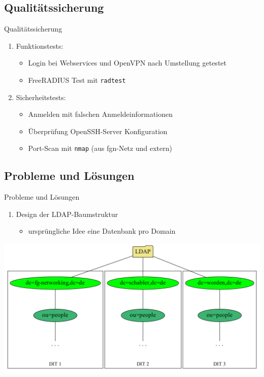 \documentclass[presentation,svgnames,12pt]{beamer}
\begin{document}
\subsection{Qualitätssicherung}
\begin{frame}{Qualitätssicherung}
\begin{enumerate}
	\item Funktionstests:
	\vspace{6pt}
	\begin{itemize}
		\item Login bei Webservices und OpenVPN nach Umstellung getestet
		\item FreeRADIUS Test mit \texttt{radtest}
	\end{itemize}
	\item Sicherheitstests:
	\vspace{6pt}
	\begin{itemize}
		\item Anmelden mit falschen Anmeldeinformationen
		\item Überprüfung OpenSSH-Server Konfiguration
		\item Port-Scan mit \texttt{nmap} (aus fgn-Netz und extern)
	\end{itemize}
\end{enumerate}
\end{frame}

\subsection{Probleme und Lösungen}
\begin{frame}{Probleme und Lösungen}
\begin{enumerate}
	\item Design der LDAP-Baumstruktur
	\vspace{6pt}
	\begin{itemize}
		\item ursprüngliche Idee eine Datenbank pro Domain
	\end{itemize}
\end{enumerate}
\centering
\includegraphics[width=\textwidth]{Bilder/LDAP-fgn-planned.pdf}
\end{frame}
\end{document}
